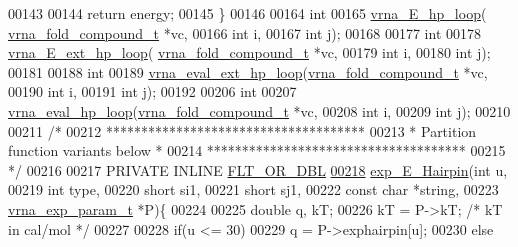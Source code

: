 \begin{DoxyCode}
00143 
00144   \textcolor{keywordflow}{return} energy;
00145 \}
00146 
00164 \textcolor{keywordtype}{int}
00165 \hyperlink{group__loops_ga999ba163a8148d72fd5f22819a681df7}{vrna\_E\_hp\_loop}( \hyperlink{group__fold__compound_structvrna__fc__s}{vrna\_fold\_compound\_t} *vc,
00166                 \textcolor{keywordtype}{int} i,
00167                 \textcolor{keywordtype}{int} j);
00168 
00177 \textcolor{keywordtype}{int}
00178 \hyperlink{group__loops_gac3393ee309372eccae944e3a07f455f9}{vrna\_E\_ext\_hp\_loop}( \hyperlink{group__fold__compound_structvrna__fc__s}{vrna\_fold\_compound\_t} *vc,
00179                     \textcolor{keywordtype}{int} i,
00180                     \textcolor{keywordtype}{int} j);
00181 
00188 \textcolor{keywordtype}{int}
00189 \hyperlink{group__loops_gad3b92453a6b501856eec8fae39f3235d}{vrna\_eval\_ext\_hp\_loop}(\hyperlink{group__fold__compound_structvrna__fc__s}{vrna\_fold\_compound\_t} *vc,
00190                       \textcolor{keywordtype}{int} i,
00191                       \textcolor{keywordtype}{int} j);
00192 
00206 \textcolor{keywordtype}{int}
00207 \hyperlink{group__loops_gab3eb4651dc26dc2b653a57dd340d7e68}{vrna\_eval\_hp\_loop}(\hyperlink{group__fold__compound_structvrna__fc__s}{vrna\_fold\_compound\_t} *vc,
00208                   \textcolor{keywordtype}{int} i,
00209                   \textcolor{keywordtype}{int} j);
00210 
00211 \textcolor{comment}{/*}
00212 \textcolor{comment}{*************************************}
00213 \textcolor{comment}{* Partition function variants below *}
00214 \textcolor{comment}{*************************************}
00215 \textcolor{comment}{*/}
00216 
00217 PRIVATE INLINE \hyperlink{group__data__structures_ga31125aeace516926bf7f251f759b6126}{FLT\_OR\_DBL}
\hypertarget{hairpin__loops_8h_source.tex_l00218}{}\hyperlink{group__loops_ga51fb555974f180b78d76142b2894851c}{00218} \hyperlink{group__loops_ga51fb555974f180b78d76142b2894851c}{exp\_E\_Hairpin}(\textcolor{keywordtype}{int} u,
00219               \textcolor{keywordtype}{int} type,
00220               \textcolor{keywordtype}{short} si1,
00221               \textcolor{keywordtype}{short} sj1,
00222               \textcolor{keyword}{const} \textcolor{keywordtype}{char} *\textcolor{keywordtype}{string},
00223               \hyperlink{group__energy__parameters_structvrna__exp__param__s}{vrna\_exp\_param\_t} *P)\{
00224 
00225   \textcolor{keywordtype}{double} q, kT;
00226   kT = P->kT;   \textcolor{comment}{/* kT in cal/mol  */}
00227 
00228   \textcolor{keywordflow}{if}(u <= 30)
00229     q = P->exphairpin[u];
00230   \textcolor{keywordflow}{else}

\end{DoxyCode}
